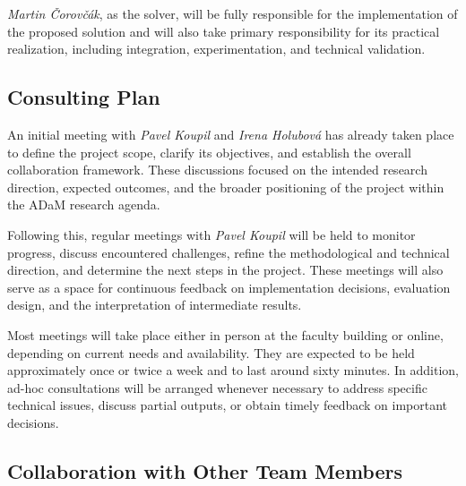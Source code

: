 \documentclass{article}
\begin{document}
\textit{Martin Čorovčák}, as the solver, will be fully responsible for the implementation of the proposed solution and will also take primary responsibility for its practical realization, including integration, experimentation, and technical validation.

\subsection{Consulting Plan}

An initial meeting with \textit{Pavel Koupil} and \textit{Irena Holubová} has already taken place to define the project scope, clarify its objectives, and establish the overall collaboration framework. These discussions focused on the intended research direction, expected outcomes, and the broader positioning of the project within the ADaM research agenda.

Following this, regular meetings with \textit{Pavel Koupil} will be held to monitor progress, discuss encountered challenges, refine the methodological and technical direction, and determine the next steps in the project. These meetings will also serve as a space for continuous feedback on implementation decisions, evaluation design, and the interpretation of intermediate results.

Most meetings will take place either in person at the faculty building or online, depending on current needs and availability. They are expected to be held approximately once or twice a week and to last around sixty minutes. In addition, ad-hoc consultations will be arranged whenever necessary to address specific technical issues, discuss partial outputs, or obtain timely feedback on important decisions.


\subsection{Collaboration with Other Team Members}
\end{document}
